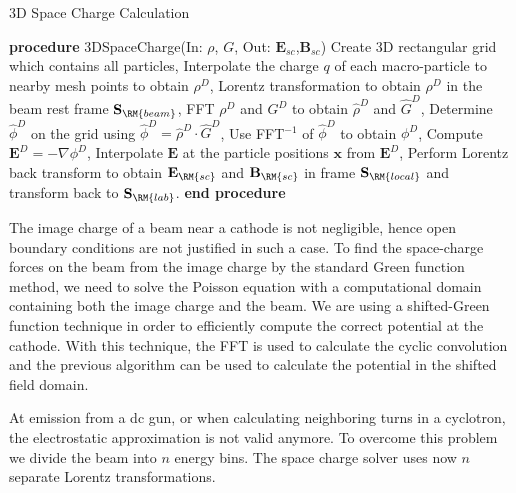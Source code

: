 \documentclass[acus]{JAC2003}
\newcommand{\bs}[1]{\mathbf #1}
\begin{document}
\begin{algorithm}
  \caption{3D Space Charge Calculation} 
  \label{alg1:sc3d}
  \begin{algorithmic}[1]
    \STATE \textbf{procedure} 3DSpaceCharge(In: $\rho$, $G$, Out: $\bs{E_{sc}}$,$\bs{B_{sc}}$)
       \STATE Create 3D rectangular grid which contains all particles, %
       \STATE Interpolate the charge $q$ of each macro-particle to nearby mesh points to obtain $\rho^D$, 
       \STATE Lorentz transformation to obtain $\rho^D$ in the beam rest frame $\bs{S}_{\RM{beam}}$,
       \STATE FFT $\rho^D$ and $G^D$ to obtain $\widehat{\rho}^D$ and $\widehat{G}^D$,
       \STATE Determine $\widehat{\phi}^D$ on the grid using $\widehat{\phi}^D = \widehat{\rho}^D \cdot \widehat{G}^D$,
       \STATE Use FFT$^{-1}$ of $\widehat{\phi }^D$ to obtain $\phi^D$,
       \STATE Compute $\bs{E}^D= -\nabla \phi^D$,
       \STATE Interpolate $\bs{E}$ at the particle positions $\bs{x}$ from $\bs{E}^D$,
       \STATE Perform Lorentz back transform to obtain $\bs{E_{\RM{sc}}}$ and $\bs{B_{\RM{sc}}}$ in  frame $\bs{S}_{\RM{local}}$ and transform back  to $\bs{S}_{\RM{lab}}$.
       \STATE \textbf{end procedure}
  \end{algorithmic}
\end{algorithm}

The image charge of a beam near a cathode is not negligible, hence
open boundary conditions are not justified in such a case. To find the space-charge forces on the beam from
the image charge by the standard Green function method,
we need to solve the Poisson equation with a computational
domain containing both the image charge and the beam.
We are using a shifted-Green function \cite{Qiang:2006p95} technique in order to efficiently compute the correct potential at the cathode.
With this technique, the FFT is used to calculate the cyclic convolution
and the previous algorithm can be used to calculate the
potential in the shifted field domain.

At  emission from a dc gun, or when calculating neighboring turns in a cyclotron, the electrostatic approximation is not valid anymore. To overcome this problem
we divide the beam into $n$ energy bins. The space charge solver uses now $n$ separate Lorentz transformations. 
\end{document}

